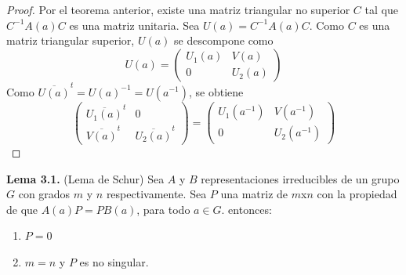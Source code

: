 \documentclass[12pt]{book}
\theoremstyle{definition}
\newcounter{in}
\begin{document}
\begin{proof}
  Por el teorema anterior, existe una matriz triangular no superior
  $C$ tal que $C^{-1}A(a)C$ es una matriz unitaria. Sea
  $U(a)=C^{-1}A(a)C$. Como $C$ es una matriz triangular superior,
  $U(a)$ se descompone como
\begin{equation*}
  U(a)=
  \begin{pmatrix}
    U_{1}(a) & V(a) \\ 
    0 & U_{2}(a)
  \end{pmatrix}
\end{equation*}  
Como $\overline{U(a)}^{t}=U(a)^{-1}=U(a^{-1})$, se obtiene
\begin{equation*}
  \begin{pmatrix}
    \overline{U_{1}(a)}^{t} & 0 \\ 
    \overline{V(a)}^{t} & \overline{U_{2}(a)}^{t}
  \end{pmatrix}
  =
  \begin{pmatrix}
    U_{1}(a^{-1}) & V(a^{-1}) \\ 
    0 & U_{2}(a^{-1})
  \end{pmatrix}
\end{equation*}
\end{proof}

\textbf{Lema 3.1.} (Lema de Schur) Sea $A$ y $B$ representaciones
irreducibles de un grupo $G$ con grados $m$ y $n$ respectivamente. Sea
$P$ una matriz de $m$x$n$ con la propiedad de que $A(a)P=PB(a)$, para
todo $a \in G$.  entonces:
\begin{enumerate}
\item $P=0$
\item $m=n$ y $P$ es no singular.
\end{enumerate}
\end{document}
